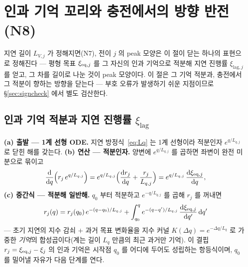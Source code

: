 \section{인과 기억 꼬리와 충전에서의 방향 반전 (N8)}\label{sec:tail}
지연 길이 $L_{V,j}$ 가 정해지면(N7), 전이 $j$ 의 peak 모양은 이 절이 닫는 하나의 표현으로 정해진다 ---
평형 목표 $\xi_{\mathrm{eq},j}$ 를 그 자신의 인과 기억으로 적분해 지연 진행률 $\xi_{\mathrm{lag},j}$ 를 얻고, 그
차를 길이로 나눈 것이 peak 모양이다. 이 절은 그 기억 적분과, 충전에서 그 적분이 향하는 방향을 닫는다 ---
부호 오류가 발생하기 쉬운 지점이므로 \S\ref{sec:signcheck} 에서 별도 검산한다.

\subsection{인과 기억 적분과 지연 진행률 $\xi_\mathrm{lag}$}\label{sec:tail-memory}
\textbf{(a) 출발 --- 1계 선형 ODE.} 지연 방정식~\eqref{eq:Lq} 는 1계 선형이라 적분인자 $e^{q/L_{q,j}}$ 로
닫힌 해를 갖는다. \textbf{(b) 연산 --- 적분인자.} 양변에 $e^{q/L_{q,j}}$ 를 곱하면 좌변이 완전 미분으로
묶이고
\begin{equation}
\frac{\mathrm{d}}{\mathrm{d} q}\Big(r_j\,e^{q/L_{q,j}}\Big)
=e^{q/L_{q,j}}\Big(\frac{\mathrm{d} r_j}{\mathrm{d} q}+\frac{r_j}{L_{q,j}}\Big)
=e^{q/L_{q,j}}\,\frac{\mathrm{d}\xi_{\mathrm{eq},j}}{\mathrm{d} q},
\label{eq:intfactor}
\end{equation}
\textbf{(c) 중간식 --- 적분해 일반해.} $q_0$ 부터 적분하고 $e^{-q/L_{q,j}}$ 를 곱해 $r_j$ 를 꺼내면
\begin{equation}
r_j(q)=r_j(q_0)\,e^{-(q-q_0)/L_{q,j}}
+\int_{q_0}^{q}e^{-(q-q')/L_{q,j}}\,\frac{\mathrm{d}\xi_{\mathrm{eq},j}}{\mathrm{d} q'}\,\mathrm{d} q'
\label{eq:memory}
\end{equation}
--- 초기 지연의 지수 감쇠 $+$ 과거 목표 변화율을 지수 커널 $K(\Delta q)=e^{-\Delta q/L_q}$ 로 가중한
\emph{기억}의 합성곱이다(계는 길이 $L_q$ 만큼의 최근 과거만 기억). 이 결핍 $r_j=\xi_{\mathrm{eq},j}-\xi_j$
의 인과 기억은 시작점 $q_0$ 를 어디에 두어도 성립하는 항등식이며, $q_0$ 를 밀어낼 자유가 다음
단계를 연다.

